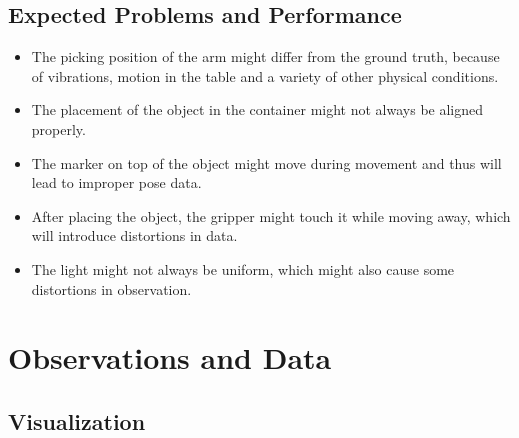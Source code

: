 \documentclass[10pt,a4paper]{article}
\begin{document}
				\subsection{Expected Problems and Performance}
					\begin{itemize}
						\item The picking position of the arm might differ from the ground truth, because of vibrations, motion in the table and a variety of other physical conditions.
						\item The placement of the object in the container might not always be aligned properly.
						\item The marker on top of the object might move during movement and thus will lead to improper pose data.
						\item After placing the object, the gripper might touch it while moving away, which will introduce distortions in data.
						\item The light might not always be uniform, which might also cause some distortions in observation.						
					\end{itemize}
					
				\section{Observations and Data}
					 \subsection{Visualization}
\end{document}
